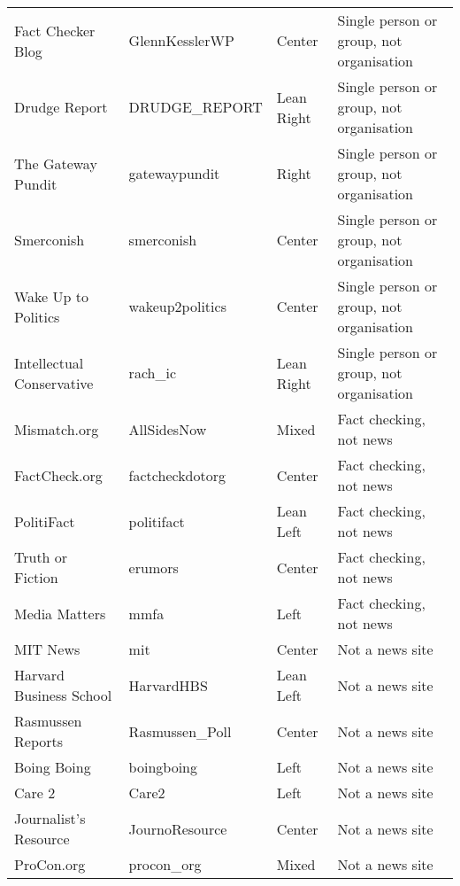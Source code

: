 \begin{tabular}{llll}
           Fact Checker Blog &   GlennKesslerWP &        Center &  Single person or group, not organisation \\
               Drudge Report &    DRUDGE\_REPORT &    Lean Right &  Single person or group, not organisation \\
          The Gateway Pundit &    gatewaypundit &         Right &  Single person or group, not organisation \\
                  Smerconish &       smerconish &        Center &  Single person or group, not organisation \\
         Wake Up to Politics &  wakeup2politics &        Center &  Single person or group, not organisation \\
   Intellectual Conservative &          rach\_ic &    Lean Right &  Single person or group, not organisation \\
                Mismatch.org &      AllSidesNow &         Mixed &                   Fact checking, not news \\
               FactCheck.org &  factcheckdotorg &        Center &                   Fact checking, not news \\
                  PolitiFact &       politifact &     Lean Left &                   Fact checking, not news \\
            Truth or Fiction &          erumors &        Center &                   Fact checking, not news \\
               Media Matters &             mmfa &          Left &                   Fact checking, not news \\
                    MIT News &              mit &        Center &                           Not a news site \\
     Harvard Business School &       HarvardHBS &     Lean Left &                           Not a news site \\
           Rasmussen Reports &   Rasmussen\_Poll &        Center &                           Not a news site \\
                 Boing Boing &       boingboing &          Left &                           Not a news site \\
                      Care 2 &            Care2 &          Left &                           Not a news site \\
       Journalist's Resource &   JournoResource &        Center &                           Not a news site \\
                  ProCon.org &       procon\_org &         Mixed &                           Not a news site \\

\end{tabular}

